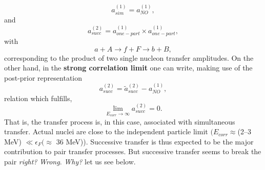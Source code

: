 %



\begin{equation}
a_{sim}^{(1)}=a_{NO}^{(1)},
\end{equation}
and
\begin{equation}
a_{succ}^{(2)}=a_{one-part}^{(1)}\times a_{one-part}^{(1)},
\end{equation}
\vspace{0.2cm}
with
\begin{equation}
a+A\rightarrow f+F \rightarrow b+B,
\end{equation}         
corresponding to the product of two single nucleon transfer amplitudes.
On the other hand, in the \textbf{strong correlation limit} one can write, making use of the
post-prior representation
\begin{equation}
 a_{succ}^{(2)}= \tilde a_{succ}^{(2)}-a_{NO}^{(1)},
\end{equation}
relation which fulfills,
\begin{equation}
\lim_{E_{corr}\rightarrow \infty}  a_{succ}^{(2)}=0.
\end{equation}
That is, the transfer process is, in this case, associated with  simultaneous transfer.
Actual nuclei are close to the independent particle limit $(E_{corr}\approx$(2--3 MeV) $\ll \epsilon_F(\approx$ 36 MeV)).  Successive transfer is thus expected to be the major contribution to pair transfer processes. But successive transfer seems to break the pair \textit{right?} \textit{Wrong}. \textit{Why?} let us see below.
